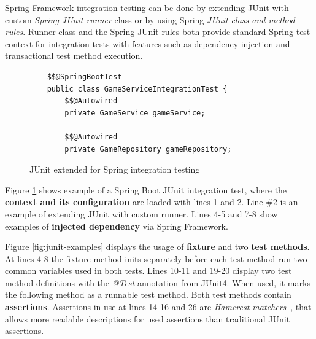     Spring Framework integration testing can be done by extending JUnit with custom \textit{Spring JUnit runner} class or by using Spring \textit{JUnit class and
    method rules}. Runner class and the Spring JUnit rules both provide standard Spring test context
    for integration tests with features such as dependency injection and transactional test method execution. ~\cite{springintegration}

    \begin{figure}[ht]
        \begin{lstlisting}[style=java]
    %%@RunWith%%(SpringJUnit4ClassRunner.class)
    $$@SpringBootTest
    public class GameServiceIntegrationTest {
        $$@Autowired
        private GameService gameService;

        $$@Autowired
        private GameRepository gameRepository;
        \end{lstlisting}
        \caption{JUnit extended for Spring integration testing}
        \label{fig:springrunner}
    \end{figure}

    Figure \ref{fig:springrunner} shows example of a Spring Boot JUnit integration test, where the \textbf{context and its configuration} are
    loaded with lines 1 and 2. Line \#2 is an example of extending JUnit with custom runner. Lines 4-5 and 7-8 show
    examples of \textbf{injected dependency} via Spring Framework.

    Figure \ref{fig:junit-examples} displays the usage of \textbf{fixture} and two \textbf{test methods}. At lines 4-8 the fixture method
    inits separately before each test method run two common variables used in both tests. Lines 10-11 and 19-20 display two test method definitions with the
    \textit{@Test}-annotation from JUnit4. When used, it marks the following method as a runnable test method. Both test methods
    contain \textbf{assertions}. Assertions in use at lines 14-16 and 26 are \textit{Hamcrest matchers}~\cite{hamcrest}, that
    allows more readable descriptions for used assertions than traditional JUnit assertions.

